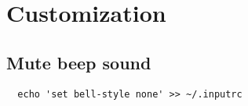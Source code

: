 
\chapter{Customization}

\section{Mute beep sound}

\lstset{language=Sh}
\begin{lstlisting}
  echo 'set bell-style none' >> ~/.inputrc
\end{lstlisting}


